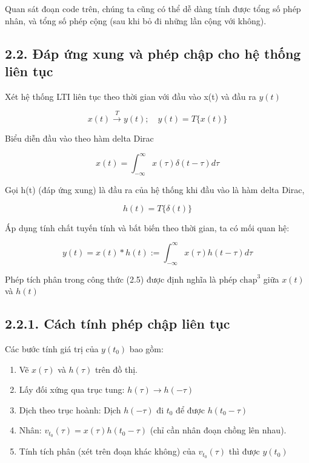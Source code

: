 \documentclass[
  10
]{article}
\begin{document}
Quan sát đoạn code trên, chúng ta cũng có thể dễ dàng tính được tổng số
phép nhân, và tổng số phép cộng (sau khi bỏ đi những lần cộng với
không).

\subsection{2.2. Đáp ứng xung và phép chập cho hệ thống liên
tục}\label{ux111uxe1p-ux1ee9ng-xung-vuxe0-phuxe9p-chux1eadp-cho-hux1ec7-thux1ed1ng-liuxean-tux1ee5c}

Xét hệ thống LTI liên tục theo thời gian với đầu vào x(t) và đầu ra
\(y ( t )\)

\[
x (t) \stackrel {T} {\longrightarrow} y (t); \quad y (t) = T \{x (t) \}
\]

Biểu diễn đầu vào theo hàm delta Dirac

\[
x (t) = \int_ {- \infty} ^ {\infty} x (\tau) \delta (t - \tau) d \tau
\]

Gọi h(t) (đáp ứng xung) là đầu ra của hệ thống khi đầu vào là hàm delta
Dirac,

\[
h (t) = T \{\delta (t) \}
\]

Áp dụng tính chất tuyến tính và bất biến theo thời gian, ta có mối quan
hệ:

\[
y (t) = x (t) * h (t) := \int_ {- \infty} ^ {\infty} x (\tau) h (t - \tau) d \tau\tag{2.5}
\]

Phép tích phân trong công thức (2.5) được định nghĩa là phép
\(\mathrm { c h a p } ^ { 3 }\) giữa \(x ( t )\) và \(h ( t )\)

\subsection{2.2.1. Cách tính phép chập liên
tục}\label{cuxe1ch-tuxednh-phuxe9p-chux1eadp-liuxean-tux1ee5c}

Các bước tính giá trị của \(y ( t _ { 0 } )\) bao gồm:

\begin{enumerate}
\def\labelenumi{(\arabic{enumi})}
\item
  Vẽ \(x ( \tau )\) và \(h ( \tau )\) trên đồ thị.
\item
  Lấy đối xứng qua trục tung: \(h ( \tau ) \to h ( - \tau )\)
\item
  Dịch theo trục hoành: Dịch \(h ( - \tau )\) đi \(t _ { 0 }\) để được
  \(h ( t _ { 0 } - \tau )\)
\item
  Nhân:
  \(v _ { t _ { 0 } } ( \tau ) = x ( \tau ) h ( t _ { 0 } - \tau )\)
  (chỉ cần nhân đoạn chồng lên nhau).
\item
  Tính tích phân (xét trên đoạn khác không) của
  \(v _ { t _ { 0 } } ( \tau )\) thì được \(y ( t _ { 0 } )\)
\end{enumerate}
\end{document}
